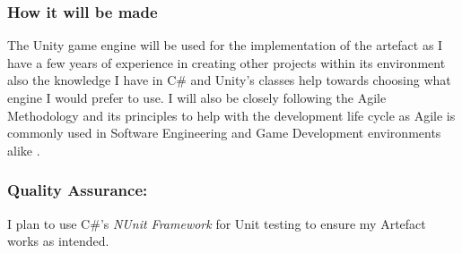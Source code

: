 \bigskip
\subsubsection*{How it will be made} The Unity game engine\cite{unity} will be used for the implementation of the artefact as I have a few years of experience in creating other projects within its environment also the knowledge I have in C\# and Unity's classes help towards choosing what engine I would prefer to use.
I will also be closely following the Agile Methodology and its principles to help with the development life cycle as Agile is commonly used in Software Engineering and Game Development environments alike \cite{game-dev-agile}.

\subsubsection*{Quality Assurance:} I plan to use C\#'s \textit{NUnit Framework} \cite{nunit-framework} for Unit testing to ensure my Artefact works as intended.
